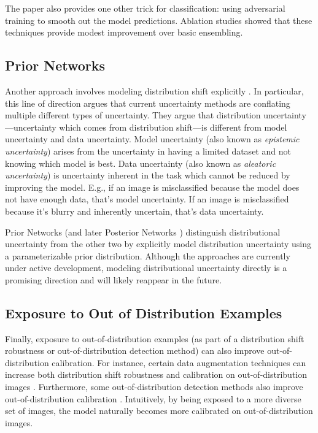 \documentclass{article}
\begin{document}
The paper also provides one other trick for classification: using adversarial training to smooth out the model predictions. Ablation studies showed that these techniques provide modest improvement over basic ensembling.

\subsection{Prior Networks} %
Another approach involves modeling distribution shift explicitly \cite{malinin2018predictive, charpentier2020posterior}. In particular, this line of direction argues that current uncertainty methods are conflating multiple different types of uncertainty. They argue that distribution uncertainty—uncertainty which comes from distribution shift—is different from model uncertainty and data uncertainty. Model uncertainty (also known as \textit{epistemic uncertainty}) arises from the uncertainty in having a limited dataset and not knowing which model is best. Data uncertainty (also known as \textit{aleatoric uncertainty}) is uncertainty inherent in the task which cannot be reduced by improving the model. E.g., if an image is misclassified because the model does not have enough data, that's model uncertainty. If an image is misclassified because it's blurry and inherently uncertain, that's data uncertainty. 

Prior Networks \cite{malinin2018predictive} (and later Posterior Networks \cite{charpentier2020posterior}) distinguish distributional uncertainty from the other two by explicitly model distribution uncertainty using a parameterizable prior distribution. Although the approaches are currently under active development, modeling distributional uncertainty directly is a promising direction and will likely reappear in the future.

\subsection{Exposure to Out of Distribution Examples}
Finally, exposure to out-of-distribution examples (as part of a distribution shift robustness or out-of-distribution detection method) can also improve out-of-distribution calibration. For instance, certain data augmentation techniques can increase both distribution shift robustness and calibration on out-of-distribution images \cite{hendrycks2021pixmix}. Furthermore, some out-of-distribution detection methods also improve out-of-distribution calibration \cite{hendrycks2018deep}. Intuitively, by being exposed to a more diverse set of images, the model naturally becomes more calibrated on out-of-distribution images.
\end{document}
